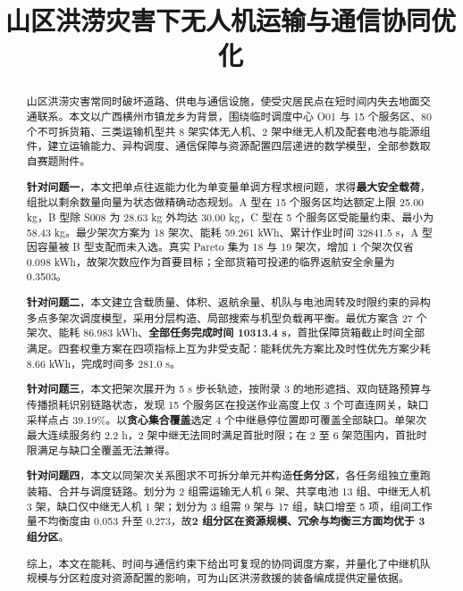 \documentclass[bwprint]{gmcmthesis}
\title{山区洪涝灾害下无人机运输与通信协同优化}
\begin{document}
\label{body:start}

\maketitle

\begin{abstract}
\label{abstract:start}
山区洪涝灾害常同时破坏道路、供电与通信设施，使受灾居民点在短时间内失去地面交通联系。本文以广西横州市镇龙乡为背景，围绕临时调度中心 O01 与 15 个服务区、80 个不可拆货箱、三类运输机型共 8 架实体无人机、2 架中继无人机及配套电池与能源组件，建立运输能力、异构调度、通信保障与资源配置四层递进的数学模型，全部参数取自赛题附件。

\textbf{针对问题一}，本文把单点往返能力化为单变量单调方程求根问题，求得\textbf{最大安全载荷}，组批以剩余数量向量为状态做精确动态规划。A 型在 15 个服务区均达额定上限 25.00 kg，B 型除 S008 为 28.63 kg 外均达 30.00 kg，C 型在 5 个服务区受能量约束、最小为 58.43 kg。最少架次方案为 18 架次、能耗 59.261 kWh、累计作业时间 32841.5 s，A 型因容量被 B 型支配而未入选。真实 Pareto 集为 18 与 19 架次，增加 1 个架次仅省 0.098 kWh，故架次数应作为首要目标；全部货箱可投递的临界返航安全余量为 0.3503。

\textbf{针对问题二}，本文建立含载质量、体积、返航余量、机队与电池周转及时限约束的异构多点多架次调度模型，采用分层构造、局部搜索与机型负载再平衡。最优方案含 27 个架次、能耗 86.983 kWh、\textbf{全部任务完成时间 10313.4 s}，首批保障货箱截止时间全部满足。四套权重方案在四项指标上互为非受支配：能耗优先方案比及时性优先方案少耗 8.66 kWh，完成时间多 281.0 s。

\textbf{针对问题三}，本文把架次展开为 5 s 步长轨迹，按附录 3 的地形遮挡、双向链路预算与传播损耗识别链路状态，发现 15 个服务区在投送作业高度上仅 3 个可直连网关，缺口采样点占 39.19\%。以\textbf{贪心集合覆盖}选定 4 个中继悬停位置即可覆盖全部缺口。单架次最大连续服务约 2.2 h，2 架中继无法同时满足首批时限；在 2 至 6 架范围内，首批时限满足与缺口全覆盖无法兼得。

\textbf{针对问题四}，本文以同架次关系图求不可拆分单元并构造\textbf{任务分区}，各任务组独立重跑装箱、合并与调度链路。划分为 2 组需运输无人机 6 架、共享电池 13 组、中继无人机 3 架，缺口仅中继无人机 1 架；划分为 3 组需 9 架与 17 组，缺口增至 5 项，组间工作量不均衡度由 0.053 升至 0.273，故\textbf{2 组分区在资源规模、冗余与均衡三方面均优于 3 组分区}。

综上，本文在能耗、时间与通信约束下给出可复现的协同调度方案，并量化了中继机队规模与分区粒度对资源配置的影响，可为山区洪涝救援的装备编成提供定量依据。

\label{abstract:end}

\end{abstract}
\end{document}
